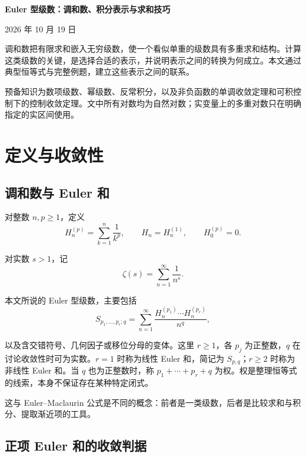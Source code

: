 \documentclass[11pt,a4paper]{article}
\begin{document}
\begin{center}
{\LARGE\bfseries Euler 型级数：调和数、积分表示与求和技巧\par}
\vspace{8pt}
{\normalsize 2026 年 10 月 19 日\par}
\end{center}
\vspace{10pt}
调和数把有限求和嵌入无穷级数，使一个看似单重的级数具有多重求和结构。计算这类级数的关键，是选择合适的表示，并说明表示之间的转换为何成立。本文通过典型恒等式与完整例题，建立这些表示之间的联系。

预备知识为数项级数、幂级数、反常积分，以及非负函数的单调收敛定理和可积控制下的控制收敛定理。文中所有对数均为自然对数；实变量上的多重对数只在明确指定的实区间使用。

\tableofcontents\clearpage

\hypertarget{sec-1}{%
\section{定义与收敛性}\label{sec-1}}

\hypertarget{sec-1-1}{%
\subsection{调和数与 Euler 和}\label{sec-1-1}}

对整数 \(n,p\geqslant1\)，定义
\[
H_n^{(p)}=\sum_{k=1}^{n}\frac1{k^p},
\qquad H_n=H_n^{(1)},
\qquad H_0^{(p)}=0.
\]

对实数 \(s>1\)，记
\[
\zeta(s)=\sum_{n=1}^{\infty}\frac1{n^s}.
\]

本文所说的 Euler 型级数，主要包括
\[
S_{p_1,\ldots,p_r;q}
=\sum_{n=1}^{\infty}
\frac{H_n^{(p_1)}\cdots H_n^{(p_r)}}{n^q},
\]

以及含交错符号、几何因子或移位分母的变体。这里 \(r\geqslant1\)，各 \(p_j\) 为正整数，\(q\) 在讨论收敛性时可为实数。\(r=1\) 时称为线性 Euler 和，简记为 \(S_{p,q}\)；\(r\geqslant2\) 时称为非线性 Euler 和。当 \(q\) 也为正整数时，称 \(p_1+\cdots+p_r+q\) 为权。权是整理恒等式的线索，本身不保证存在某种特定闭式。

这与 Euler--Maclaurin 公式是不同的概念：前者是一类级数，后者是比较求和与积分、提取渐近项的工具。

\hypertarget{sec-1-2}{%
\subsection{正项 Euler 和的收敛判据}\label{sec-1-2}}
\end{document}
